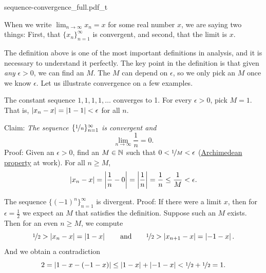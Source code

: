 \begin{myfigureht}
{sequence-convergence_full.pdf_t}
\caption{Illustration of convergence.
On top, we show the first ten points of the sequence as a graph
with $M$ and the interval around the limit $x$ marked.
On bottom, the points of the same sequence are marked on the
number line.\label{figsequenceconvergence}}
\end{myfigureht}

When we write $\lim_{n\to\infty} x_n = x$ for some real number $x$, we are saying two
things: First, that $\{ x_n \}_{n=1}^\infty$ is convergent, and second, that the limit is
$x$.

The definition above is one of the most important definitions in analysis,
and it is necessary to understand it perfectly.  The key point in the
definition is that given \emph{any} $\epsilon > 0$, we can find an $M$.  The
$M$ can depend on $\epsilon$, so we only pick an $M$ once we know
$\epsilon$.  Let us illustrate convergence on a few examples.

\begin{example}
The constant sequence $1,1,1,1,\ldots$ converges to 1.  For
every $\epsilon > 0$, pick $M = 1$.  That is, $\lvert {x_n-x} \rvert = \lvert {1-1} \rvert < \epsilon$ for all $n$.
\end{example}

\begin{example}
Claim: \emph{The sequence $\{ \nicefrac{1}{n} \}_{n=1}^\infty$ is convergent and}
\begin{equation*}
\lim_{n\to \infty} \frac{1}{n} = 0 .
\end{equation*}
Proof: Given an $\epsilon > 0$, find an $M \in {\mathbb{N}}$ such that
$0 < \nicefrac{1}{M} < \epsilon$
(\hyperref[thm:arch:i]{Archimedean property} at work).
For all $n \geq M$,
\begin{equation*}
\left\lvert {x_n - x} \right\rvert
=
\left\lvert {\frac{1}{n} - 0} \right\rvert = \left\lvert {\frac{1}{n}} \right\rvert = \frac{1}{n} \leq \frac{1}{M} < \epsilon .
\end{equation*}
\end{example}

\begin{example}
The sequence $\bigl\{ {(-1)}^n \bigr\}_{n=1}^\infty$ is divergent.  Proof: If there
were a limit $x$, then for $\epsilon = \frac{1}{2}$ we expect an $M$ that
satisfies the definition.  Suppose
such an $M$ exists.
Then for an even $n \geq M$, we compute
\begin{equation*}
\nicefrac{1}{2} > \left\lvert {x_n - x} \right\rvert  = \left\lvert {1 - x} \right\rvert
\qquad \text{and} \qquad
\nicefrac{1}{2} > \left\lvert {x_{n+1} - x} \right\rvert  = \left\lvert {-1 - x} \right\rvert .
\end{equation*}
And we obtain a contradiction
\begin{equation*}
2 = \left\lvert {1 - x - (-1 -x)} \right\rvert \leq
\left\lvert {1 - x} \right\rvert + \left\lvert {-1 -x} \right\rvert < \nicefrac{1}{2} + \nicefrac{1}{2} = 1 .
\end{equation*}
\end{example}

